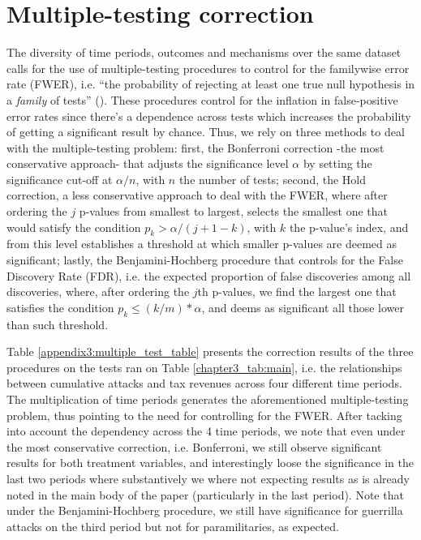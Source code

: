 \newpage

\section{Multiple-testing correction \label{appendix3:multiple_test}}

The diversity of time periods, outcomes and mechanisms over the same dataset calls for the use of multiple-testing procedures to control for the familywise error rate (FWER), i.e. ``the probability of rejecting at least one true null hypothesis in a \emph{family} of tests'' (\citet{dafoeetal2017}). These procedures control for the inflation in false-positive error rates since there's a dependence across tests which increases the probability of getting a significant result by chance. Thus, we rely on three methods to deal with the multiple-testing problem: first, the Bonferroni correction -the most conservative approach- that adjusts the significance level $\alpha$ by setting the significance cut-off at $\alpha/n$, with $n$ the number of tests; second, the Hold correction, a less conservative approach to deal with the FWER, where after ordering the $j$ p-values from smallest to largest, selects the smallest one that would satisfy the condition $p_k > \alpha/(j+1-k)$, with $k$ the p-value's index, and from this level establishes a threshold at which smaller p-values are deemed as significant; lastly, the Benjamini-Hochberg procedure that controls for the False Discovery Rate (FDR), i.e. the expected proportion of false discoveries among all discoveries, where, after ordering the $j$th p-values, we find the largest one that satisfies the condition $p_k \leq (k/m)*\alpha$, and deems as significant all those lower than such threshold. 

Table \ref{appendix3:multiple_test_table} presents the correction results of the three procedures on the tests ran on Table \ref{chapter3_tab:main}, i.e. the relationships between cumulative attacks and tax revenues across four different time periods. The multiplication of time periods generates the aforementioned multiple-testing problem, thus pointing to the need for controlling for the FWER. After tacking into account the dependency across the 4 time periods, we note that even under the most conservative correction, i.e. Bonferroni, we still observe significant results for both treatment variables, and interestingly loose the significance in the last two periods where substantively we where not expecting results as is already noted in the main body of the paper (particularly in the last period). Note that under the Benjamini-Hochberg procedure, we still have significance for guerrilla attacks on the third period but not for paramilitaries, as expected. 

